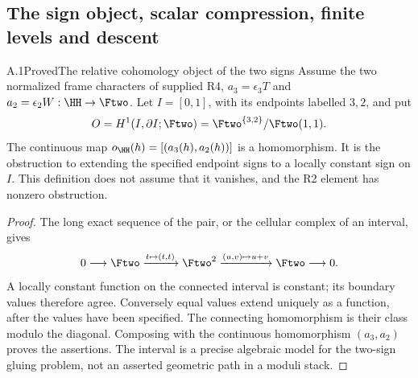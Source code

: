 \subsection{The sign object, scalar compression, finite levels and descent}


\begin{statement}{A.1}{Proved}{The relative cohomology object of the two signs}
Assume the two normalized frame characters of supplied R4,
$a_3=\epsilon_3T$ and $a_2=\epsilon_2W:\HH\to\Ftwo$.
Let $I=[0,1]$, with its endpoints labelled $3,2$, and put
\[
 O=H^1(I,\partial I;\Ftwo)
   =\Ftwo^{\{3,2\}}/\Ftwo(1,1).
\]
The continuous map
$o_{\HH}(h)=[(a_3(h),a_2(h))]$ is a homomorphism.
It is the obstruction to extending the specified endpoint signs to a
locally constant sign on $I$. This definition does not assume that it
vanishes, and the R2 element has nonzero obstruction.
\end{statement}
\begin{proof}
The long exact sequence of the pair, or the cellular complex of an
interval, gives
\[
0\longrightarrow\Ftwo\xrightarrow{t\mapsto(t,t)}
\Ftwo^2\xrightarrow{(u,v)\mapsto u+v}\Ftwo\longrightarrow0.
\]
A locally constant function on the connected interval is constant;
its boundary values therefore agree. Conversely equal values extend
uniquely as a function, after the values have been specified. The
connecting homomorphism is their class modulo the diagonal. Composing
with the continuous homomorphism $(a_3,a_2)$ proves the assertions.
The interval is a precise algebraic model for the two-sign gluing
problem, not an asserted geometric path in a moduli stack.
\end{proof}

